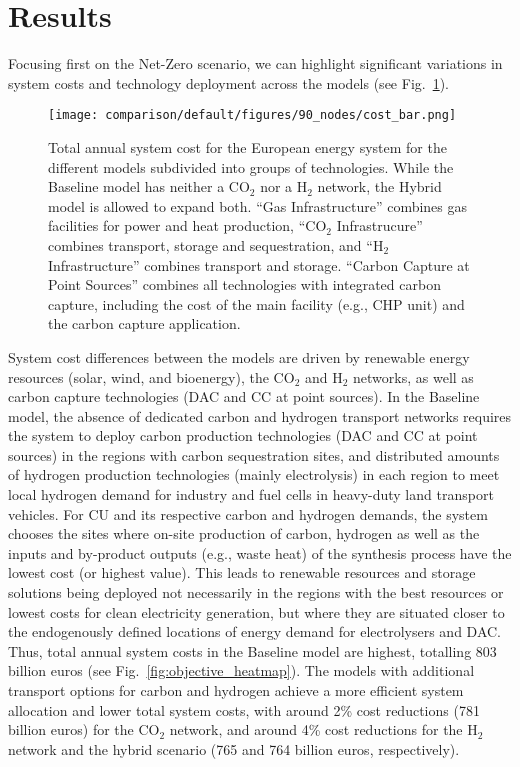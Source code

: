 \documentclass[twocolumn]{article}
\newcommand{\carbon}{CO$_2$}
\newcommand{\hydrogen}{H$_2$}
\begin{document}
\section{Results}
\label{sec:results}


Focusing first on the Net-Zero scenario, we can highlight significant variations in system costs and technology deployment across the models (see Fig.~\ref{fig:cost_bar}).

\begin{figure}[ht!]
    \centering
    \texttt{[image: comparison/default/figures/90\_nodes/cost\_bar.png]}
    \caption[short]{Total annual system cost for the European energy system for the different models subdivided into groups of technologies. While the Baseline model has neither a \carbon{} nor a \hydrogen{} network, the Hybrid model is allowed to expand both. ``Gas Infrastructure'' combines gas facilities for power and heat production, ``\carbon{} Infrastrucure'' combines transport, storage and sequestration, and ``H$_2$ Infrastructure'' combines transport and storage. ``Carbon Capture at Point Sources'' combines all technologies with integrated carbon capture, including the cost of the main facility (e.g., CHP unit) and the carbon capture application.}
    \label{fig:cost_bar}
\end{figure}

System cost differences between the models are driven by renewable energy resources (solar, wind, and bioenergy), the \carbon{} and \hydrogen{} networks, as well as carbon capture technologies (DAC and CC at point sources).
In the Baseline model, the absence of dedicated carbon and hydrogen transport networks requires the system to deploy carbon production technologies (DAC and CC at point sources) in the regions with carbon sequestration sites, and distributed amounts of hydrogen production technologies (mainly electrolysis) in each region to meet local hydrogen demand for industry and fuel cells in heavy-duty land transport vehicles.
For CU and its respective carbon and hydrogen demands, the system chooses the sites where on-site production of carbon, hydrogen as well as the inputs and by-product outputs (e.g., waste heat) of the synthesis process have the lowest cost (or highest value). This leads to renewable resources and storage solutions being deployed not necessarily in the regions with the best resources or lowest costs for clean electricity generation, but where they are situated closer to the endogenously defined locations of energy demand for electrolysers and DAC.
Thus, total annual system costs in the Baseline model are highest, totalling \label{}803 billion euros (see Fig.~\ref{fig:objective_heatmap}). The models with additional transport options for carbon and hydrogen achieve a more efficient system allocation and lower total system costs, with around \label{}2\% cost reductions (\label{}781 billion euros) for the \carbon{} network, and around \label{}4\% cost reductions for the \hydrogen{} network and the hybrid scenario (\label{}765 and \label{}764 billion euros, respectively).
\end{document}
